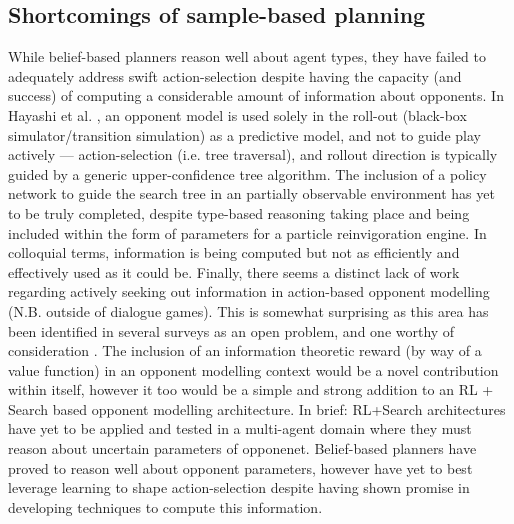 \subsection{Shortcomings of sample-based planning}
While belief-based planners reason well about agent types, they have failed to adequately address swift action-selection despite having the capacity (and success) of computing a considerable amount of information about opponents. 
In Hayashi et al. \cite{Hayashi_et_al2020}, an opponent model is used solely in the roll-out (black-box simulator/transition simulation) as a predictive model, and not to guide play actively --- action-selection (i.e. tree traversal), and rollout direction is typically guided by a generic upper-confidence tree algorithm.
 The inclusion of a policy network to guide the search tree in an partially observable environment has yet to be truly completed, despite type-based reasoning taking place and being included within the form of parameters for a particle reinvigoration engine. In colloquial terms, information is being computed but not as efficiently and effectively used as it could be.
\newline \newline
Finally, there seems a distinct lack of work regarding actively seeking out information in action-based opponent modelling (N.B. outside of dialogue games). This is somewhat surprising as this area has been identified in several surveys as an open problem, and one worthy of consideration \cite{ALBRECHT201866,Hernandez-Leal_MAL_Survey}. The inclusion of an information theoretic reward (by way of a value function) in an opponent modelling context would be a novel contribution within itself, however it too would be a simple and strong addition to an RL + Search based opponent modelling architecture. 
\newline \newline
In brief: RL+Search architectures have yet to be applied and tested in a multi-agent domain where they must reason about uncertain parameters of opponenet. Belief-based planners have proved to reason well about opponent parameters, however have yet to best leverage learning to shape action-selection despite having shown promise in developing techniques to compute this information.